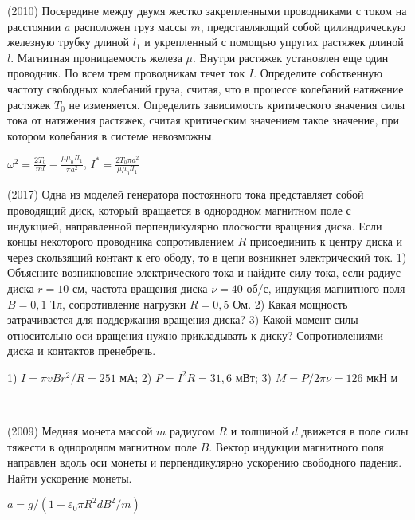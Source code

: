 \begin{ex}
(2010) Посередине между двумя жестко закрепленными проводниками с током на расстоянии $a$ расположен груз массы $m$, представляющий собой цилиндрическую железную трубку длиной $l_1$ и укрепленный с помощью упругих растяжек длиной $l$. 
Магнитная проницаемость железа $\mu$. Внутри растяжек установлен еще один проводник. По всем трем проводникам течет ток $I$. 
Определите собственную частоту свободных колебаний груза, считая, что в процессе колебаний натяжение растяжек $T_0$ не изменяется. 
Определить зависимость критического значения силы тока от натяжения растяжек, считая критическим значением такое значение, при котором колебания в системе невозможны.
\begin{center}

\end{center}
\begin{ans}
$\omega^2 = \frac{2 T_0}{ml} - \frac{\mu \mu_0 I l_1}{\pi a^2}$, $I^* = \frac{2T_0 \pi a^2}{\mu \mu_0 l l_1}$
\end{ans}
\end{ex}

\begin{ex}
(2017) Одна из моделей генератора постоянного тока представляет собой проводящий диск, который вращается в однородном магнитном поле с индукцией,
направленной перпендикулярно плоскости вращения диска. Если концы некоторого проводника сопротивлением $R$ присоединить к центру диска и через скользящий контакт к его ободу, то в цепи возникнет электрический ток. 1) Объясните возникновение электрического тока и найдите силу тока, если радиус диска $r = 10$ см, частота вращения диска $\nu = 40$ об/с, индукция магнитного поля $B = 0,1$ Тл, сопротивление нагрузки $R = 0,5$ Ом. 2) Какая мощность затрачивается для поддержания вращения диска? 3) Какой момент силы относительно оси вращения нужно прикладывать к диску? Сопротивлениями диска и контактов пренебречь.
\begin{center}

\end{center}
\begin{ans}
1) $I=\pi v B r^2/R = 251$ мА; 2) $P = I^2 R = 31,6$ мВт; 3) $M = P/2 \pi \nu = 126$ мкН м
\end{ans}
\end{ex}

\begin{ex}
\hspace{0pt} \\
\begin{minipage}{.65\textwidth}
(2009) Медная монета массой $m$ радиусом $R$ и толщиной $d$ движется в поле силы тяжести в однородном магнитном поле $B$. 
Вектор индукции магнитного поля направлен вдоль оси монеты и перпендикулярно ускорению свободного падения. Найти ускорение монеты.
\end{minipage}
\begin{minipage}{.35\textwidth}
\centering

\end{minipage}
\begin{ans}
$a=g/(1+ \varepsilon_0 \pi R^2 d B^2 / m)$
\end{ans}
\end{ex}

